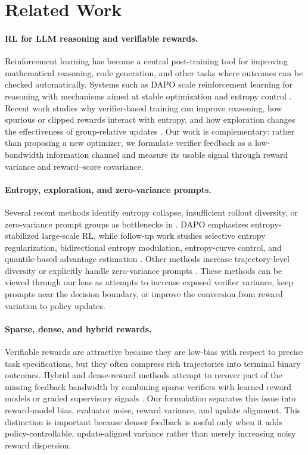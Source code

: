 \section{Related Work}

\paragraph{RL for LLM reasoning and verifiable rewards.}
Reinforcement learning has become a central post-training tool for improving mathematical reasoning, code generation, and other tasks where outcomes can be checked automatically. Systems such as DAPO scale reinforcement learning for \llm{} reasoning with mechanisms aimed at stable optimization and entropy control \cite{dapo_2025}. Recent \rlvr{} work studies why verifier-based training can improve reasoning, how spurious or clipped rewards interact with entropy, and how exploration changes the effectiveness of group-relative updates \cite{exploration_exploitation_rlvr_2026,wen2025reinforcement,he2025random}. Our work is complementary: rather than proposing a new optimizer, we formulate verifier feedback as a low-bandwidth information channel and measure its usable signal through reward variance and reward--score covariance.

\paragraph{Entropy, exploration, and zero-variance prompts.}
Several recent methods identify entropy collapse, insufficient rollout diversity, or zero-variance prompt groups as bottlenecks in \llm{} \rlvr{}. DAPO emphasizes entropy-stabilized large-scale RL, while follow-up work studies selective entropy regularization, bidirectional entropy modulation, entropy-curve control, and quantile-based advantage estimation \cite{dapo_2025,siren2025,asymgrpo2026,entrocraft2026,qae2025}. Other methods increase trajectory-level diversity or explicitly handle zero-variance prompts \cite{lookahead_rollouts_2026,eepo_2026,no_prompt_left_behind_2026}. These methods can be viewed through our lens as attempts to increase exposed verifier variance, keep prompts near the decision boundary, or improve the conversion from reward variation to policy updates.

\paragraph{Sparse, dense, and hybrid rewards.}
Verifiable rewards are attractive because they are low-bias with respect to precise task specifications, but they often compress rich trajectories into terminal binary outcomes. Hybrid and dense-reward methods attempt to recover part of the missing feedback bandwidth by combining sparse verifiers with learned reward models or graded supervisory signals \cite{hybrid_reinforcement_2026}. Our formulation separates this issue into reward-model bias, evaluator noise, reward variance, and update alignment. This distinction is important because denser feedback is useful only when it adds policy-controllable, update-aligned variance rather than merely increasing noisy reward dispersion.

